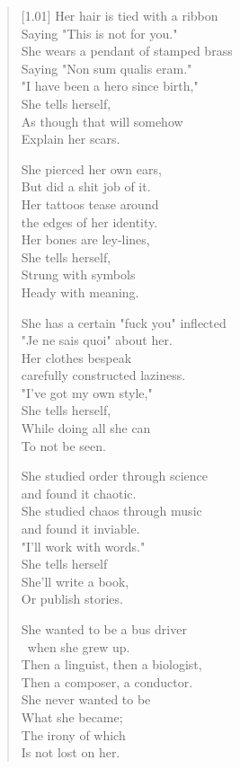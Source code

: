 \begin{verse}[1.01\textwidth]
Her hair is tied with a ribbon\\
\vin Saying "This is not for you."\\
She wears a pendant of stamped brass\\
\vin Saying "Non sum qualis eram."\\
"I have been a hero since birth,"\\
\vin She tells herself,\\
\vin \vin As though that will somehow\\
\vin \vin \vin Explain her scars.

She pierced her own ears,\\
\vin But did a shit job of it.\\
Her tattoos tease around\\
\vin the edges of her identity.\\
Her bones are ley-lines,\\
\vin She tells herself,\\
\vin \vin Strung with symbols\\
\vin \vin \vin Heady with meaning.

She has a certain "fuck you" inflected\\
\vin "Je ne sais quoi" about her.\\
Her clothes bespeak\\
\vin carefully constructed laziness.\\
"I've got my own style,"\\
\vin She tells herself,\\
\vin \vin While doing all she can\\
\vin \vin \vin To not be seen.

She studied order through science\\
\vin and found it chaotic.\\
She studied chaos through music\\
\vin and found it inviable.\\
"I'll work with words."\\
\vin She tells herself\\
\vin \vin She'll write a book,\\
\vin \vin \vin Or publish stories.

She wanted to be a bus driver\\\
\vin when she grew up.\\
Then a linguist, then a biologist,\\
\vin Then a composer, a conductor.\\
She never wanted to be\\
\vin What she became;\\
\vin \vin The irony of which\\
\vin \vin \vin Is not lost on her.
\end{verse}
